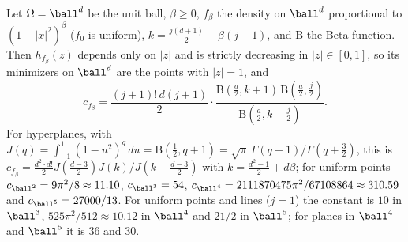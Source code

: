 \begin{corollary}\label{cor:ball}
Let $\Omega=\ball^d$ be the unit ball, $\beta\ge0$, $f_\beta$ the density on $\ball^d$ proportional to $(1-|x|^2)^\beta$ ($f_0$ is uniform),
$k=\frac{j(d+1)}2+\beta(j+1)$, and $\mathrm B$ the Beta function. Then $h_{f_\beta}(z)$ depends only on $|z|$ and is strictly decreasing in
$|z|\in[0,1]$, so its minimizers on $\ball^d$ are the points with $|z|=1$, and
\[
  c_{f_\beta}=\frac{(j+1)!\,d(j+1)}{2}\cdot\frac{\mathrm B(\frac a2,k+1)\,\mathrm B(\frac a2,\frac j2)}{\mathrm B(\frac a2,k+\frac j2)}.
\]
For hyperplanes, with $J(q)=\int_{-1}^1(1-u^2)^q\,du=\mathrm B(\frac12,q+1)=\sqrt\pi\,\Gamma(q+1)/\Gamma(q+\frac32)$, this is
$c_{f_\beta}=\frac{d^2\cdot d!}{2}J(\frac{d-3}2)J(k)/J(k+\frac{d-3}2)$ with $k=\frac{d^2-1}2+d\beta$; for uniform points $c_{\ball^2}=9\pi^2/8\approx11.10$,
$c_{\ball^3}=54$, $c_{\ball^4}=2111870475\pi^2/67108864\approx310.59$ and $c_{\ball^5}=27000/13$. For uniform points and lines ($j=1$) the
constant is $10$ in $\ball^3$, $525\pi^2/512\approx10.12$ in $\ball^4$ and $21/2$ in $\ball^5$; for planes in $\ball^4$ and $\ball^5$ it is $36$
and $30$.
\end{corollary}

